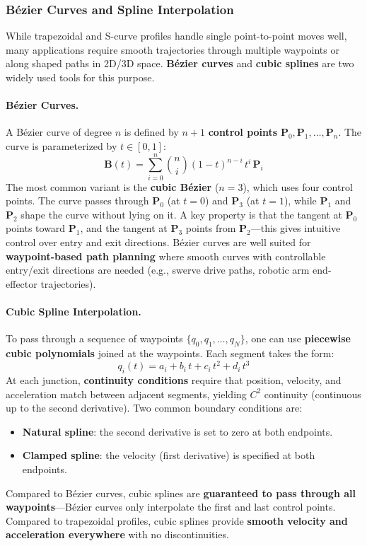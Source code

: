 \subsubsection{B\'{e}zier Curves and Spline Interpolation}

While trapezoidal and S-curve profiles handle single point-to-point moves well, many applications require smooth trajectories through multiple waypoints or along shaped paths in 2D/3D space. \textbf{B\'{e}zier curves} and \textbf{cubic splines} are two widely used tools for this purpose.

\paragraph{B\'{e}zier Curves.}
A B\'{e}zier curve of degree $n$ is defined by $n+1$ \textbf{control points} $\mathbf{P}_0, \mathbf{P}_1, \ldots, \mathbf{P}_n$. The curve is parameterized by $t \in [0,1]$:
\[
\mathbf{B}(t) = \sum_{i=0}^{n} \binom{n}{i}(1-t)^{n-i}\,t^{i}\,\mathbf{P}_i
\]
The most common variant is the \textbf{cubic B\'{e}zier} ($n=3$), which uses four control points. The curve passes through $\mathbf{P}_0$ (at $t=0$) and $\mathbf{P}_3$ (at $t=1$), while $\mathbf{P}_1$ and $\mathbf{P}_2$ shape the curve without lying on it. A key property is that the tangent at $\mathbf{P}_0$ points toward $\mathbf{P}_1$, and the tangent at $\mathbf{P}_3$ points from $\mathbf{P}_2$---this gives intuitive control over entry and exit directions. B\'{e}zier curves are well suited for \textbf{waypoint-based path planning} where smooth curves with controllable entry/exit directions are needed (e.g., swerve drive paths, robotic arm end-effector trajectories).

\paragraph{Cubic Spline Interpolation.}
To pass through a sequence of waypoints $\{q_0, q_1, \ldots, q_N\}$, one can use \textbf{piecewise cubic polynomials} joined at the waypoints. Each segment takes the form:
\[
q_i(t) = a_i + b_i\,t + c_i\,t^2 + d_i\,t^3
\]
At each junction, \textbf{continuity conditions} require that position, velocity, and acceleration match between adjacent segments, yielding $C^2$ continuity (continuous up to the second derivative). Two common boundary conditions are:
\begin{itemize}
    \item \textbf{Natural spline}: the second derivative is set to zero at both endpoints.
    \item \textbf{Clamped spline}: the velocity (first derivative) is specified at both endpoints.
\end{itemize}
Compared to B\'{e}zier curves, cubic splines are \textbf{guaranteed to pass through all waypoints}---B\'{e}zier curves only interpolate the first and last control points. Compared to trapezoidal profiles, cubic splines provide \textbf{smooth velocity and acceleration everywhere} with no discontinuities.


